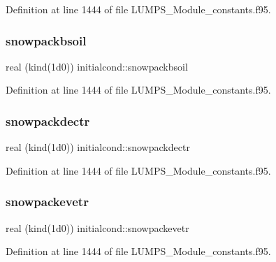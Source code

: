 Definition at line 1444 of file L\+U\+M\+P\+S\+\_\+\+Module\+\_\+constants.\+f95.

\mbox{\label{namespaceinitialcond_ab04d6bfb1300cff5f2870d1a66d86058}} 
\subsubsection{\texorpdfstring{snowpackbsoil}{snowpackbsoil}}
{\footnotesize\ttfamily real (kind(1d0)) initialcond\+::snowpackbsoil}



Definition at line 1444 of file L\+U\+M\+P\+S\+\_\+\+Module\+\_\+constants.\+f95.

\mbox{\label{namespaceinitialcond_ac930faf4b87e883e788bb46e4e495bdb}} 
\subsubsection{\texorpdfstring{snowpackdectr}{snowpackdectr}}
{\footnotesize\ttfamily real (kind(1d0)) initialcond\+::snowpackdectr}



Definition at line 1444 of file L\+U\+M\+P\+S\+\_\+\+Module\+\_\+constants.\+f95.

\mbox{\label{namespaceinitialcond_a05602f6c4a611d494dd26c2f617307be}} 
\subsubsection{\texorpdfstring{snowpackevetr}{snowpackevetr}}
{\footnotesize\ttfamily real (kind(1d0)) initialcond\+::snowpackevetr}



Definition at line 1444 of file L\+U\+M\+P\+S\+\_\+\+Module\+\_\+constants.\+f95.

\mbox{\label{namespaceinitialcond_a99c6060a146af926b3c850a3ff3e521d}} 

